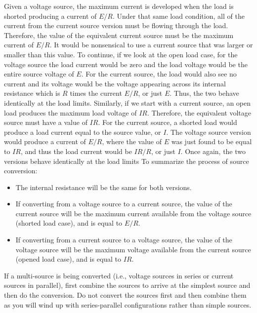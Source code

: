 \documentclass{report}
\begin{document}
\begin{itemize}
            \bigbreak \noindent 
            Given a voltage source, the maximum current is developed when the load is shorted producing a current of $E/R$. Under that same load condition, all of the current from the current source version must be flowing through the load. Therefore, the value of the equivalent current source must be the maximum current of $E/R$. It would be nonsensical to use a current source that was larger or smaller than this value.
            \bigbreak \noindent 
            To continue, if we look at the open load case, for the voltage source the load current would be zero and the load voltage would be the entire source voltage of $E$. For the current source, the load would also see no current and its voltage would be the voltage appearing across its internal resistance which is $R$ times the current $E/R$, or just $E$. Thus, the two behave identically at the load limits.
            \bigbreak \noindent 
            Similarly, if we start with a current source, an open load produces the maximum load voltage of $IR$. Therefore, the equivalent voltage source must have a value of $IR$. For the current source, a shorted load would produce a load current equal to the source value, or $I$. The voltage source version would produce a current of $E/R$, where the value of $E$ was just found to be equal to $IR$, and thus the load current would be $IR/R$, or just $I$. Once again, the two versions behave identically at the load limits
            \bigbreak \noindent 
            To summarize the process of source conversion:
            \begin{itemize}
                \item The internal resistance will be the same for both versions.
                \item If converting from a voltage source to a current source, the value of the current source will be the maximum current available from the voltage source (shorted load case), and is equal to $E/R$.
                \item If converting from a current source to a voltage source, the value of the voltage source will be the maximum voltage available from the current source (opened load case), and is equal to $IR$.
            \end{itemize}
            If a multi-source is being converted (i.e., voltage sources in series or current sources in parallel), first combine the sources to arrive at the simplest source and then do the conversion. Do not convert the sources first and then combine them as you will wind up with series-parallel configurations rather than simple sources.

\end{itemize}
\end{document}
